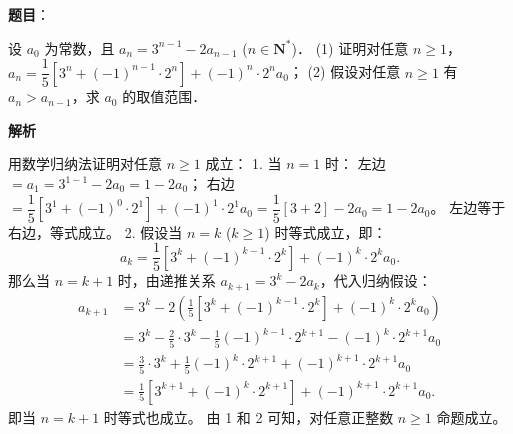 \begin{answer}

\textbf{题目}：

设 $a_0$ 为常数，且 $a_n = 3^{n-1} - 2a_{n-1}$ ($n \in \mathbf{N}^*$)．
(1) 证明对任意 $n \ge 1$，$a_n = \dfrac{1}{5}[3^n + (-1)^{n-1} \cdot 2^n] + (-1)^n \cdot 2^n a_0$；
(2) 假设对任意 $n \ge 1$ 有 $a_n > a_{n-1}$，求 $a_0$ 的取值范围．

\textbf{解析}


用数学归纳法证明对任意 $n \ge 1$ 成立：
1. 当 $n = 1$ 时：
   左边 $= a_1 = 3^{1-1} - 2a_0 = 1 - 2a_0$；
   右边 $= \dfrac{1}{5}[3^1 + (-1)^0 \cdot 2^1] + (-1)^1 \cdot 2^1 a_0 = \dfrac{1}{5}[3 + 2] - 2a_0 = 1 - 2a_0$。
   左边等于右边，等式成立。
2. 假设当 $n = k$ ($k \ge 1$) 时等式成立，即：
\nopagebreak[4]
\[a_k = \frac{1}{5}[3^k + (-1)^{k-1} \cdot 2^k] + (-1)^k \cdot 2^k a_0.\]
   那么当 $n = k + 1$ 时，由递推关系 $a_{k+1} = 3^k - 2a_k$，代入归纳假设：
\nopagebreak[4]
\[\begin{aligned}
a_{k+1} &= 3^k - 2\left(\frac{1}{5}[3^k + (-1)^{k-1} \cdot 2^k] + (-1)^k \cdot 2^k a_0\right) \\
&= 3^k - \frac{2}{5}\cdot 3^k - \frac{1}{5}(-1)^{k-1}\cdot 2^{k+1} - (-1)^k \cdot 2^{k+1} a_0 \\
&= \frac{3}{5}\cdot 3^k + \frac{1}{5}(-1)^k \cdot 2^{k+1} + (-1)^{k+1} \cdot 2^{k+1} a_0 \\
&= \frac{1}{5}[3^{k+1} + (-1)^k \cdot 2^{k+1}] + (-1)^{k+1} \cdot 2^{k+1} a_0.
\end{aligned}\]
   即当 $n = k + 1$ 时等式也成立。
由 1 和 2 可知，对任意正整数 $n \ge 1$ 命题成立。



\end{answer}
